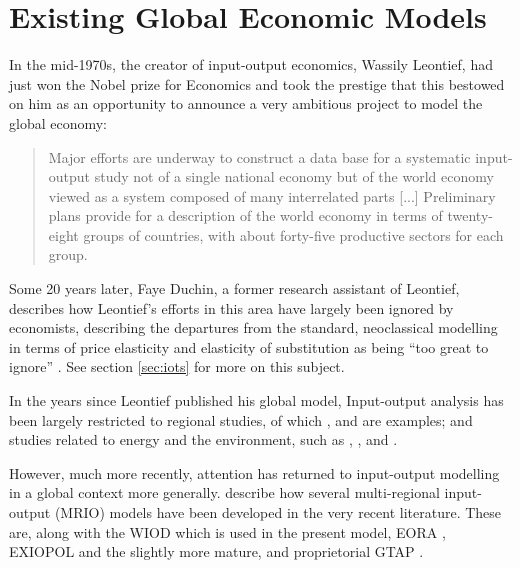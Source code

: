 \documentclass[a4paper]{article}
\begin{document}
\section{Existing Global Economic Models} \label{sec:litreview}
In the mid-1970s, the creator of input-output economics, Wassily Leontief, had just won the Nobel prize for Economics and took the prestige that this bestowed on him as an opportunity to announce a very ambitious project to model the global economy:

\begin{quotation}
Major efforts are underway to construct a data base for a systematic input-output study not of a single national economy but of the world economy viewed as a system composed of many interrelated parts [...]
Preliminary plans provide for a description of the world economy in terms of twenty-eight groups of countries, with about forty-five productive sectors for each group. 
\end{quotation}

Some 20 years later, Faye Duchin, a former research assistant of Leontief, describes how Leontief's efforts in this area have largely been ignored by economists, describing the departures from the standard, neoclassical modelling in terms of price elasticity and elasticity of substitution as being ``too great to ignore'' \parencite{Duchin2004}. 
See section \ref{sec:iots} for more on this subject.

In the years since Leontief published his global model, Input-output analysis has been largely restricted to regional studies, of which \textcite{Akita1993}, \textcite{Khan1999} and \textcite{Luo2013a} are examples; and studies related to energy and the environment, such as  \textcite{Leontief1970}, \textcite{Joshi1999}, \textcite{Bergh2002} and \textcite{Hendrickson2006}.

However, much more recently, attention has returned to input-output modelling in a global context more generally. \textcite{Tukker2013} describe how several multi-regional input-output (MRIO) models have been developed in the very recent literature.
These are, along with the WIOD which is used in the present model, EORA \parencite{Lenzen2012}, EXIOPOL \parencite{Tukker2013a} and the slightly more mature, and proprietorial GTAP \parencite{Walmsley2012}.
\end{document}

